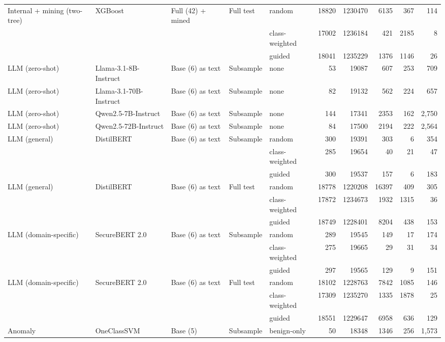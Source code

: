 \begin{longtable}{lllllrrrrr}
\addlinespace
Internal + mining (two-tree) & XGBoost & Full (42) + mined & Full test & random & 18820 & 1230470 & 6135 & 367 & 114 \\
 &  &  &  & class-weighted & 17002 & 1236184 & 421 & 2185 & 8 \\
 &  &  &  & guided & 18041 & 1235229 & 1376 & 1146 & 26 \\
\midrule
LLM (zero-shot) & Llama-3.1-8B-Instruct & Base (6) as text & Subsample & none & 53 & 19087 & 607 & 253 & 709 \\
\addlinespace
LLM (zero-shot) & Llama-3.1-70B-Instruct & Base (6) as text & Subsample & none & 82 & 19132 & 562 & 224 & 657 \\
\addlinespace
LLM (zero-shot) & Qwen2.5-7B-Instruct & Base (6) as text & Subsample & none & 144 & 17341 & 2353 & 162 & 2,750 \\
\addlinespace
LLM (zero-shot) & Qwen2.5-72B-Instruct & Base (6) as text & Subsample & none & 84 & 17500 & 2194 & 222 & 2,564 \\
\addlinespace
LLM (general) & DistilBERT & Base (6) as text & Subsample & random & 300 & 19391 & 303 & 6 & 354 \\
 &  &  &  & class-weighted & 285 & 19654 & 40 & 21 & 47 \\
 &  &  &  & guided & 300 & 19537 & 157 & 6 & 183 \\
\addlinespace
LLM (general) & DistilBERT & Base (6) as text & Full test & random & 18778 & 1220208 & 16397 & 409 & 305 \\
 &  &  &  & class-weighted & 17872 & 1234673 & 1932 & 1315 & 36 \\
 &  &  &  & guided & 18749 & 1228401 & 8204 & 438 & 153 \\
\addlinespace
LLM (domain-specific) & SecureBERT 2.0 & Base (6) as text & Subsample & random & 289 & 19545 & 149 & 17 & 174 \\
 &  &  &  & class-weighted & 275 & 19665 & 29 & 31 & 34 \\
 &  &  &  & guided & 297 & 19565 & 129 & 9 & 151 \\
\addlinespace
LLM (domain-specific) & SecureBERT 2.0 & Base (6) as text & Full test & random & 18102 & 1228763 & 7842 & 1085 & 146 \\
 &  &  &  & class-weighted & 17309 & 1235270 & 1335 & 1878 & 25 \\
 &  &  &  & guided & 18551 & 1229647 & 6958 & 636 & 129 \\
\midrule
Anomaly & OneClassSVM & Base (5) & Subsample & benign-only & 50 & 18348 & 1346 & 256 & 1,573 \\

\end{longtable}

